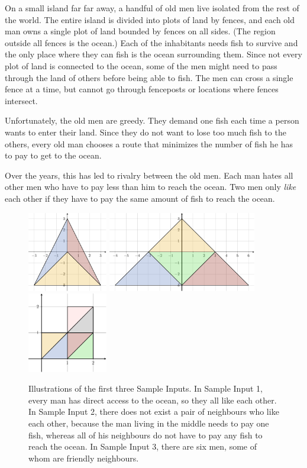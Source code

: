
On a small island far far away, a handful of old men live isolated from the rest of the world.
The entire island is divided into plots of land by fences, and each old man owns
a single plot of land bounded by fences on all sides. (The region
outside all fences is the ocean.)
Each of the inhabitants needs fish to survive and the only place where they can fish is the ocean surrounding them.
Since not every plot of land is connected to the ocean,
some of the men might need to pass through the land of others before being able to fish.
The men can cross a single fence at a time, but cannot go through fenceposts or
locations where fences intersect.

Unfortunately, the old men are greedy.
They demand one fish each time a person wants to enter their land.
Since they do not want to lose too much fish to the others,
every old man chooses a route that minimizes the number of fish he has to pay to get to the ocean.

Over the years, this has led to rivalry between the old men.
Each man hates all other men who have to pay less than him to reach the ocean.
Two men only \emph{like} each other if they have to pay the same amount of fish to reach the ocean.

\begin{figure}[h]
  \centering
  \hfill
  \includegraphics[height=3.5cm]{sample1.pdf}
  \hfill
  \includegraphics[height=3.5cm]{sample2.pdf}
  \hfill
  \includegraphics[height=3.5cm]{sample3.pdf}
  \hfill
  \hfill
  \caption{
    Illustrations of the first three Sample Inputs.
    In Sample Input 1, every man has direct access to the ocean, so they all like each other.
    In Sample Input 2, there does not exist a pair of neighbours who like each other,
    because the man living in the middle needs to pay one fish,
    whereas all of his neighbours do not have to pay any fish to reach the ocean.
    In Sample Input 3, there are six men, some of whom are friendly neighbours.
  }
  \label{fig:islands}
\end{figure}

